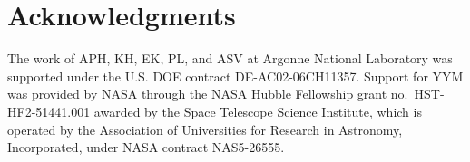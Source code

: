 \documentclass[modern]{descnote}
\begin{document}
\clearpage
\section*{Acknowledgments}
{}



The work of APH, KH, EK, PL, and ASV at Argonne National Laboratory was supported under the U.S. DOE contract DE-AC02-06CH11357.
Support for YYM was provided by NASA through the NASA Hubble Fellowship grant no.\ HST-HF2-51441.001 awarded by the Space Telescope Science Institute, which is operated by the Association of Universities for Research in Astronomy, Incorporated, under NASA contract NAS5-26555. 

\end{document}
